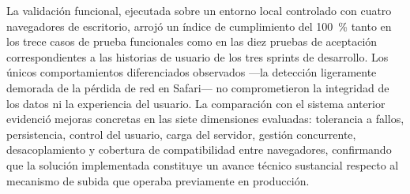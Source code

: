 La validación funcional, ejecutada sobre un entorno local controlado con cuatro navegadores de
escritorio, arrojó un índice de cumplimiento del 100~\% tanto en los trece casos de prueba
funcionales como en las diez pruebas de aceptación correspondientes a las historias de usuario de
los tres sprints de desarrollo. Los únicos comportamientos diferenciados observados ---la detección
ligeramente demorada de la pérdida de red en Safari--- no comprometieron la integridad de los datos
ni la experiencia del usuario. La comparación con el sistema anterior evidenció mejoras concretas en
las siete dimensiones evaluadas: tolerancia a fallos, persistencia, control del usuario, carga del
servidor, gestión concurrente, desacoplamiento y cobertura de compatibilidad entre navegadores,
confirmando que la solución implementada constituye un avance técnico sustancial respecto al
mecanismo de subida que operaba previamente en producción.